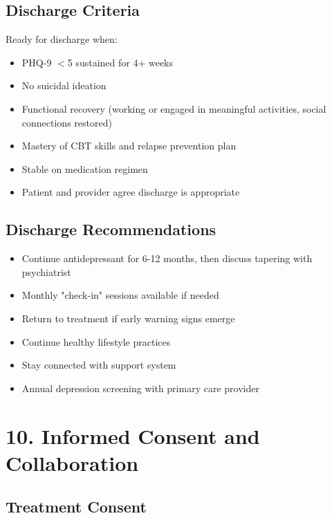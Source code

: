 \documentclass[11pt,letterpaper]{article}
\begin{document}
\subsection*{Discharge Criteria}

Ready for discharge when:
\begin{itemize}[leftmargin=*]
    \item PHQ-9 $<$5 sustained for 4+ weeks
    \item No suicidal ideation
    \item Functional recovery (working or engaged in meaningful activities, social connections restored)
    \item Mastery of CBT skills and relapse prevention plan
    \item Stable on medication regimen
    \item Patient and provider agree discharge is appropriate
\end{itemize}

\subsection*{Discharge Recommendations}

\begin{itemize}[leftmargin=*]
    \item Continue antidepressant for 6-12 months, then discuss tapering with psychiatrist
    \item Monthly "check-in" sessions available if needed
    \item Return to treatment if early warning signs emerge
    \item Continue healthy lifestyle practices
    \item Stay connected with support system
    \item Annual depression screening with primary care provider
\end{itemize}

\section*{10. Informed Consent and Collaboration}

\subsection*{Treatment Consent}
\end{document}

